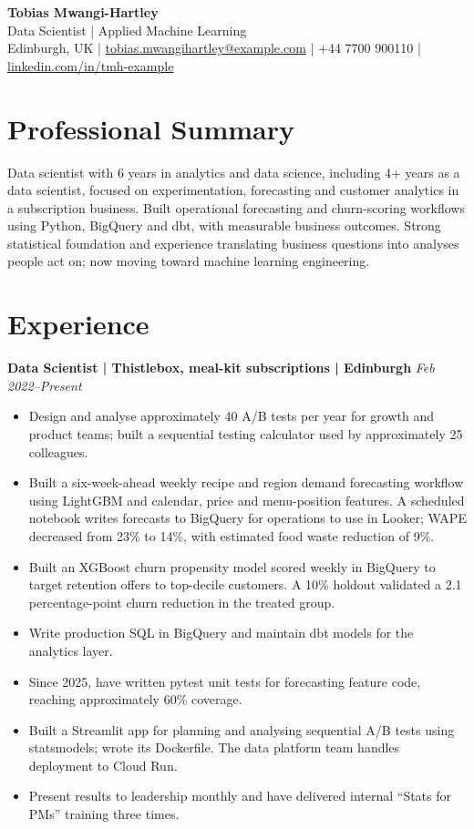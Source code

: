 \documentclass[11pt,a4paper]{article}
\begin{document}
\begin{center}
{\Huge\bfseries\color{primarycolor} Tobias Mwangi-Hartley}\\[0.3em]
{\large\color{accentcolor} Data Scientist | Applied Machine Learning}\\[0.3em]
Edinburgh, UK | \href{mailto:tobias.mwangihartley@example.com}{tobias.mwangihartley@example.com} | +44 7700 900110 | \href{https://linkedin.com/in/tmh-example}{linkedin.com/in/tmh-example}
\end{center}

\section*{Professional Summary}
Data scientist with 6 years in analytics and data science, including 4+ years as a data scientist, focused on experimentation, forecasting and customer analytics in a subscription business. Built operational forecasting and churn-scoring workflows using Python, BigQuery and dbt, with measurable business outcomes. Strong statistical foundation and experience translating business questions into analyses people act on; now moving toward machine learning engineering.

\section*{Experience}
\textbf{Data Scientist | Thistlebox, meal-kit subscriptions | Edinburgh} \hfill \textit{Feb 2022–Present}
\begin{itemize}
\item Design and analyse approximately 40 A/B tests per year for growth and product teams; built a sequential testing calculator used by approximately 25 colleagues.
\item Built a six-week-ahead weekly recipe and region demand forecasting workflow using LightGBM and calendar, price and menu-position features. A scheduled notebook writes forecasts to BigQuery for operations to use in Looker; WAPE decreased from 23\% to 14\%, with estimated food waste reduction of 9\%.
\item Built an XGBoost churn propensity model scored weekly in BigQuery to target retention offers to top-decile customers. A 10\% holdout validated a 2.1 percentage-point churn reduction in the treated group.
\item Write production SQL in BigQuery and maintain dbt models for the analytics layer.
\item Since 2025, have written pytest unit tests for forecasting feature code, reaching approximately 60\% coverage.
\item Built a Streamlit app for planning and analysing sequential A/B tests using statsmodels; wrote its Dockerfile. The data platform team handles deployment to Cloud Run.
\item Present results to leadership monthly and have delivered internal “Stats for PMs” training three times.
\end{itemize}
\end{document}
